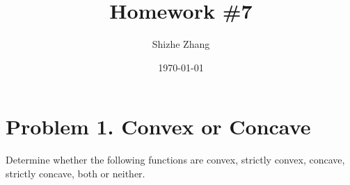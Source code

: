 \documentclass[
  12pt,
]{fphw}
\title{Homework \#7} %
\author{Shizhe Zhang} %
\date{\today} %
\institute{University of California, Berkeley \\ Department of Statistics} %
\begin{document}
\maketitle %

\section*{Problem 1. Convex or Concave}

Determine whether the following functions are convex, strictly convex, concave, strictly concave, both or neither.
\end{document}
